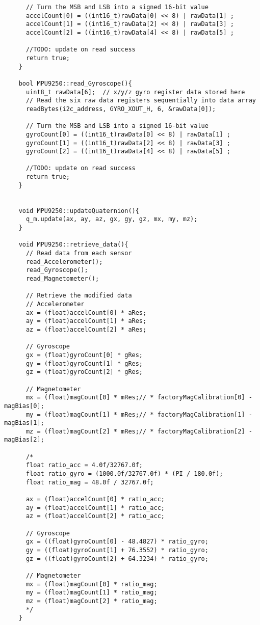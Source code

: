 \begin{lstlisting}
	  // Turn the MSB and LSB into a signed 16-bit value
	  accelCount[0] = ((int16_t)rawData[0] << 8) | rawData[1] ;
	  accelCount[1] = ((int16_t)rawData[2] << 8) | rawData[3] ;
	  accelCount[2] = ((int16_t)rawData[4] << 8) | rawData[5] ;

	  //TODO: update on read success
	  return true;
	}

	bool MPU9250::read_Gyroscope(){
	  uint8_t rawData[6];  // x/y/z gyro register data stored here
	  // Read the six raw data registers sequentially into data array
	  readBytes(i2c_address, GYRO_XOUT_H, 6, &rawData[0]);

	  // Turn the MSB and LSB into a signed 16-bit value
	  gyroCount[0] = ((int16_t)rawData[0] << 8) | rawData[1] ;
	  gyroCount[1] = ((int16_t)rawData[2] << 8) | rawData[3] ;
	  gyroCount[2] = ((int16_t)rawData[4] << 8) | rawData[5] ;

	  //TODO: update on read success
	  return true;
	}


	void MPU9250::updateQuaternion(){
	  q_m.update(ax, ay, az, gx, gy, gz, mx, my, mz);
	}

	void MPU9250::retrieve_data(){
	  // Read data from each sensor
	  read_Accelerometer();
	  read_Gyroscope();
	  read_Magnetometer();

	  // Retrieve the modified data
	  // Accelerometer
	  ax = (float)accelCount[0] * aRes;
	  ay = (float)accelCount[1] * aRes;
	  az = (float)accelCount[2] * aRes;

	  // Gyroscope
	  gx = (float)gyroCount[0] * gRes;
	  gy = (float)gyroCount[1] * gRes;
	  gz = (float)gyroCount[2] * gRes;

	  // Magnetometer
	  mx = (float)magCount[0] * mRes;// * factoryMagCalibration[0] - magBias[0];
	  my = (float)magCount[1] * mRes;// * factoryMagCalibration[1] - magBias[1];
	  mz = (float)magCount[2] * mRes;// * factoryMagCalibration[2] - magBias[2];
	  
	  /*
	  float ratio_acc = 4.0f/32767.0f;
	  float ratio_gyro = (1000.0f/32767.0f) * (PI / 180.0f);
	  float ratio_mag = 48.0f / 32767.0f;

	  ax = (float)accelCount[0] * ratio_acc;
	  ay = (float)accelCount[1] * ratio_acc;
	  az = (float)accelCount[2] * ratio_acc;

	  // Gyroscope
	  gx = ((float)gyroCount[0] - 48.4827) * ratio_gyro;
	  gy = ((float)gyroCount[1] + 76.3552) * ratio_gyro;
	  gz = ((float)gyroCount[2] + 64.3234) * ratio_gyro;

	  // Magnetometer
	  mx = (float)magCount[0] * ratio_mag;
	  my = (float)magCount[1] * ratio_mag;
	  mz = (float)magCount[2] * ratio_mag;
	  */
	}


\end{lstlisting}
